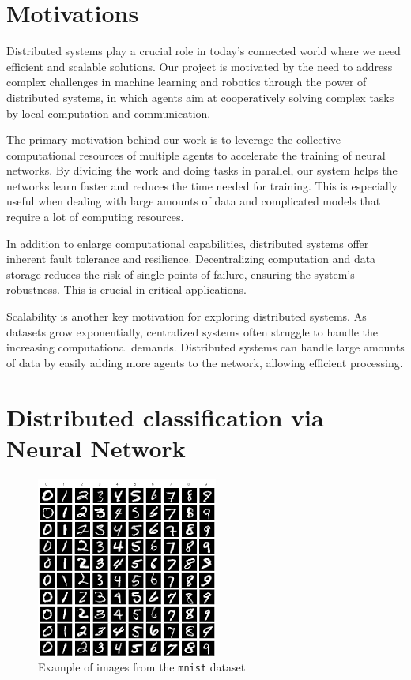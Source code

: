 \documentclass[a4paper,11pt,oneside]{book}
\begin{document}
\tableofcontents \thispagestyle{empty}

\newpage
\chapter*{Motivations} 
Distributed systems play a crucial role in today's connected world where we need efficient and scalable solutions. Our project is motivated by the need to address complex challenges in machine learning and robotics through the power of distributed systems, in which agents aim at cooperatively solving complex tasks by local computation and communication.

\bigskip
The primary motivation behind our work is to leverage the collective computational resources of multiple agents to accelerate the training of neural networks. By dividing the work and doing tasks in parallel, our system helps the networks learn faster and reduces the time needed for training. This is especially useful when dealing with large amounts of data and complicated models that require a lot of computing resources.

In addition to enlarge computational capabilities, distributed systems offer inherent fault tolerance and resilience. Decentralizing computation and data storage reduces the risk of single points of failure, ensuring the system's robustness. This is crucial in critical applications.

Scalability is another key motivation for exploring distributed systems. As datasets grow exponentially, centralized systems often struggle to handle the increasing computational demands. Distributed systems can handle large amounts of data by easily adding more agents to the network, allowing efficient processing.




\chapter{Distributed classification via Neural Network}

\begin{figure}
	\centering
	\includegraphics[scale=0.5]{mnist}
	\caption{Example of images from the \texttt{mnist} dataset}
	\label{mnist}
\end{figure}
\end{document}

